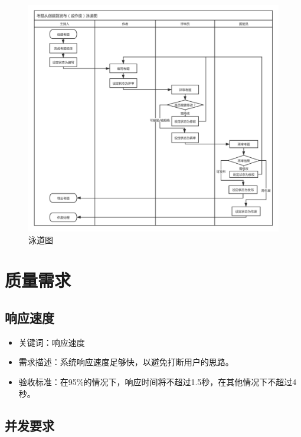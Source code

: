 \documentclass[hyperref, a4paper]{ctexart}
\providecommand{\tightlist}{%
  \setlength{\itemsep}{0pt}\setlength{\parskip}{0pt}}
\begin{document}
\begin{figure}
  \centering
  \includegraphics[scale=0.33]{./assets/swimlane_diagram.pdf}
  \caption{泳道图}\label{4}
\end{figure}

\pagebreak

\hypertarget{ux8d28ux91cfux9700ux6c42}{%
\section{质量需求}\label{ux8d28ux91cfux9700ux6c42}}

\hypertarget{ux54cdux5e94ux901fux5ea6}{%
\subsection{响应速度}\label{ux54cdux5e94ux901fux5ea6}}

\begin{itemize}
\tightlist
\item
  关键词：响应速度
\item
  需求描述：系统响应速度足够快，以避免打断用户的思路。
\item
  验收标准：在95\%的情况下，响应时间将不超过1.5秒，在其他情况下不超过4秒。
\end{itemize}

\hypertarget{ux5e76ux53d1ux8981ux6c42}{%
\subsection{并发要求}\label{ux5e76ux53d1ux8981ux6c42}}
\end{document}

